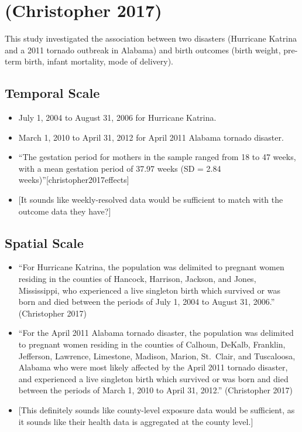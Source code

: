 \documentclass[
]{article}
\providecommand{\tightlist}{%
  \setlength{\itemsep}{0pt}\setlength{\parskip}{0pt}}
\begin{document}
\hypertarget{christopher2017effects}{%
\section{(Christopher 2017)}\label{christopher2017effects}}

This study investigated the association between two disasters (Hurricane
Katrina and a 2011 tornado outbreak in Alabama) and birth outcomes
(birth weight, pre-term birth, infant mortality, mode of delivery).

\hypertarget{temporal-scale-16}{%
\subsection{Temporal Scale}\label{temporal-scale-16}}

\begin{itemize}
\tightlist
\item
  July 1, 2004 to August 31, 2006 for Hurricane Katrina.
\item
  March 1, 2010 to April 31, 2012 for April 2011 Alabama tornado
  disaster.
\item
  ``The gestation period for mothers in the sample ranged from 18 to 47
  weeks, with a mean gestation period of 37.97 weeks (SD = 2.84
  weeks)''{[}christopher2017effects{]}
\item
  {[}It sounds like weekly-resolved data would be sufficient to match
  with the outcome data they have?{]}
\end{itemize}

\hypertarget{spatial-scale-16}{%
\subsection{Spatial Scale}\label{spatial-scale-16}}

\begin{itemize}
\tightlist
\item
  ``For Hurricane Katrina, the population was delimited to pregnant
  women residing in the counties of Hancock, Harrison, Jackson, and
  Jones, Mississippi, who experienced a live singleton birth which
  survived or was born and died between the periods of July 1, 2004 to
  August 31, 2006.'' (Christopher 2017)
\item
  ``For the April 2011 Alabama tornado disaster, the population was
  delimited to pregnant women residing in the counties of Calhoun,
  DeKalb, Franklin, Jefferson, Lawrence, Limestone, Madison, Marion,
  St.~Clair, and Tuscaloosa, Alabama who were most likely affected by
  the April 2011 tornado disaster, and experienced a live singleton
  birth which survived or was born and died between the periods of March
  1, 2010 to April 31, 2012.'' (Christopher 2017)
\item
  {[}This definitely sounds like county-level exposure data would be
  sufficient, as it sounds like their health data is aggregated at the
  county level.{]}
\end{itemize}
\end{document}
